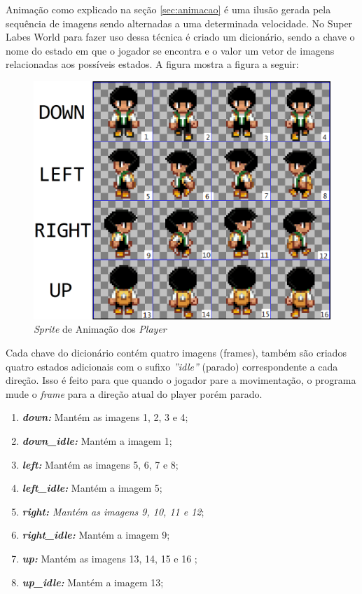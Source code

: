 \clearpage
Animação como explicado na seção \ref{sec:animacao} é uma ilusão gerada pela sequência de imagens sendo alternadas a uma determinada velocidade. No Super Labes World para fazer uso dessa técnica é criado um dicionário, sendo a chave o nome do estado em que o jogador se encontra e o valor um vetor de imagens relacionadas aos possíveis estados. A figura mostra a figura a seguir:
\begin{figure}[h!]
    \centering
    \includegraphics[width=1\linewidth]{figuras/player-animation.png}
    \caption{\textit{Sprite} de Animação dos \textit{Player} }
    \label{fig:player-animation}
\end{figure}

Cada chave do dicionário contém quatro imagens (frames), também são criados quatro estados adicionais com o sufixo \textit{''idle''} (parado) correspondente a cada direção. Isso é feito para que quando o jogador pare a movimentação, o programa mude o \textit{frame} para a direção atual do player porém parado. 
\begin{enumerate}
    \item \textit{\textbf{down:}} Mantém as imagens 1, 2, 3 e 4;
    \item \textit{\textbf{down\_idle:}} Mantém a imagem 1;
    \item \textit{\textbf{left:}} Mantém as imagens 5, 6, 7 e 8;
    \item \textit{\textbf{left\_idle:}} Mantém a imagem 5;
    \item \textit{\textbf{right:} Mantém as imagens 9, 10, 11 e 12};
    \item \textit{\textbf{right\_idle:}} Mantém a imagem 9;
    \item \textit{\textbf{up:}} Mantém as imagens 13, 14, 15 e 16 ;
    \item \textit{\textbf{up\_idle:}} Mantém a imagem 13;
\end{enumerate}

